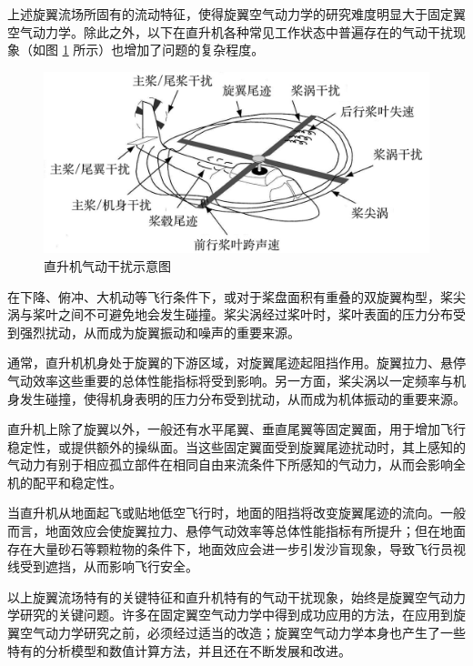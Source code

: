 上述旋翼流场所固有的流动特征，使得旋翼空气动力学的研究难度明显大于固定翼空气动力学。除此之外，以下在直升机各种常见工作状态中普遍存在的气动干扰现象（如图
\ref{fig:helicopter-aerodynamic-interference} 所示）也增加了问题的复杂程度。
\begin{figure}[h!]
\centering{}\includegraphics[width=1\textwidth,height=0.22\textheight,keepaspectratio]{../review/figures/aero-interaction}
\caption{\label{fig:helicopter-aerodynamic-interference}直升机气动干扰示意图}
\end{figure}

\begin{description}[wide]
\item [{桨–涡干扰}] 在下降、俯冲、大机动等飞行条件下，或对于桨盘面积有重叠的双旋翼构型，桨尖涡与桨叶之间不可避免地会发生碰撞。桨尖涡经过桨叶时，桨叶表面的压力分布受到强烈扰动，从而成为旋翼振动和噪声的重要来源。
\item [{旋翼–机身干扰}] 通常，直升机机身处于旋翼的下游区域，对旋翼尾迹起阻挡作用。旋翼拉力、悬停气动效率这些重要的总体性能指标将受到影响。另一方面，桨尖涡以一定频率与机身发生碰撞，使得机身表明的压力分布受到扰动，从而成为机体振动的重要来源。 
\item [{旋翼–固定翼干扰}] 直升机上除了旋翼以外，一般还有水平尾翼、垂直尾翼等固定翼面，用于增加飞行稳定性，或提供额外的操纵面。当这些固定翼面受到旋翼尾迹扰动时，其上感知的气动力有别于相应孤立部件在相同自由来流条件下所感知的气动力，从而会影响全机的配平和稳定性。
\item [{旋翼–地面干扰}] 当直升机从地面起飞或贴地低空飞行时，地面的阻挡将改变旋翼尾迹的流向。一般而言，地面效应会使旋翼拉力、悬停气动效率等总体性能指标有所提升；但在地面存在大量砂石等颗粒物的条件下，地面效应会进一步引发沙盲现象，导致飞行员视线受到遮挡，从而影响飞行安全。 
\end{description}

以上旋翼流场特有的关键特征和直升机特有的气动干扰现象，始终是旋翼空气动力学研究的关键问题。许多在固定翼空气动力学中得到成功应用的方法，在应用到旋翼空气动力学研究之前，必须经过适当的改造；旋翼空气动力学本身也产生了一些特有的分析模型和数值计算方法，并且还在不断发展和改进。

